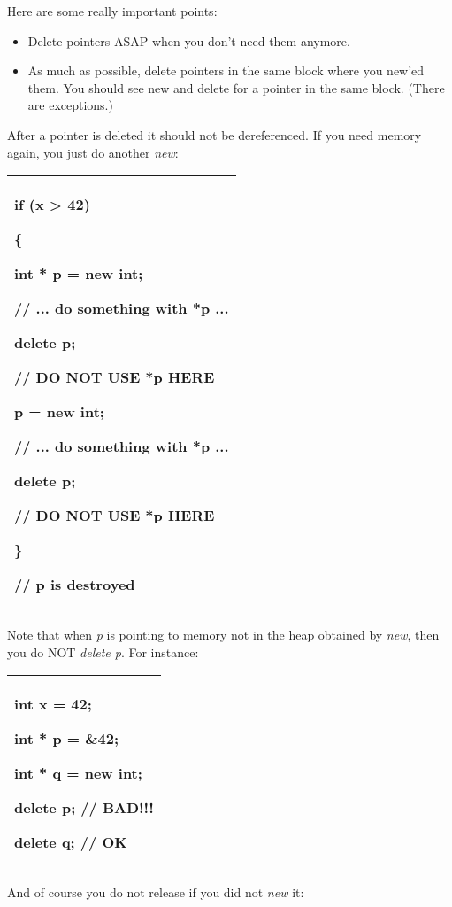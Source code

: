 \documentclass[
]{article}
\providecommand{\tightlist}{%
  \setlength{\itemsep}{0pt}\setlength{\parskip}{0pt}}
\begin{document}
Here are some really important points:

\begin{itemize}
\tightlist
\item
  Delete pointers ASAP when you don't need them anymore.
\item
  As much as possible, delete pointers in the same block where you
  new'ed them. You should see new and delete for a pointer in the same
  block. (There are exceptions.)
\end{itemize}

After a pointer is deleted it should not be dereferenced. If you need
memory again, you just do another \emph{new}:

\begin{longtable}[]{@{}l@{}}
\toprule
\endhead
\begin{minipage}[t]{0.97\columnwidth}\raggedright
if (x \textgreater{} 42)

\{

int * p = new int;

// ... do something with *p ...

delete p;

// DO NOT USE *p HERE

p = new int;

// ... do something with *p ...

delete p;

// DO NOT USE *p HERE

\}

// p is destroyed \strut
\end{minipage}\tabularnewline
\bottomrule
\end{longtable}

Note that when \emph{p} is pointing to memory not in the heap obtained
by \emph{new}, then you do NOT \emph{delete p}. For instance:

\begin{longtable}[]{@{}l@{}}
\toprule
\endhead
\begin{minipage}[t]{0.97\columnwidth}\raggedright
int x = 42;

int * p = \&42;

int * q = new int;

delete p; // BAD!!!

delete q; // OK\strut
\end{minipage}\tabularnewline
\bottomrule
\end{longtable}

And of course you do not release if you did not \emph{new} it:
\end{document}
